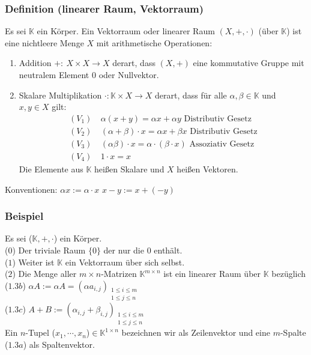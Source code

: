 \subsubsection{Definition (linearer Raum, Vektorraum)}
Es sei $\mathbb{K}$ ein Körper.  Ein Vektorraum oder linearer Raum $(X,+,\cdot )$ (über $\mathbb{K}$) ist eine nichtleere Menge $X$ mit arithmetische Operationen:
\begin{enumerate}
\item Addition $+:\ X\times X\rightarrow X$ derart, dass $(X,+)$ eine kommutative Gruppe mit neutralem Element $0$ oder Nullvektor.
\item Skalare Multiplikation $\cdot :\mathbb{K}\times X\rightarrow X$ derart, dass für alle $\alpha ,\beta \in \mathbb{K}$ und $x,y\in X$ gilt:
\begin{align*}
(V_1)&\ \alpha (x+y) = \alpha x+\alpha y \text{ Distributiv Gesetz}\\
(V_2)&\ (\alpha +\beta ) \cdot x = \alpha x + \beta x \text{ Distributiv Gesetz} \\
(V_3)&\ (\alpha\beta )\cdot x = \alpha \cdot (\beta \cdot x) \text{ Assoziativ Gesetz}\\
(V_4)&\ 1\cdot x = x
\end{align*}
Die Elemente aus $\mathbb{K}$ heißen Skalare und $X$ heißen Vektoren.
\end{enumerate}
Konventionen: $\alpha x := \alpha\cdot x$  $x-y:=x+(-y)$
\subsubsection{Beispiel}
Es sei ($\mathbb{K},+,\cdot $) ein Körper.\\
($0$) Der triviale Raum $\{0\}$ der nur die $0$ enthält.\\
($1$) Weiter ist $\mathbb{K}$ ein Vektorraum über sich selbst.\\
($2$) Die Menge aller $m\times n$-Matrizen $\mathbb{K}^{m\times n}$ ist ein linearer Raum über $\mathbb{K}$ bezüglich\\
($1.3b$) $\alpha A := \alpha A = (\alpha a_{i,j})_{\substack{1\leq i\leq m\\1\leq j\leq n}}$\\
($1.3c$) $A+B := (\alpha _{i,j}+\beta _{i,j})_{\substack{1\leq i\leq m\\1\leq j\leq n}}$\\
Ein $n$-Tupel ($x_1,\cdots ,x_n$)$\in \mathbb{K}^{1\times n}$ bezeichnen wir als Zeilenvektor und eine $m$-Spalte ($1.3a$) als Spaltenvektor.
